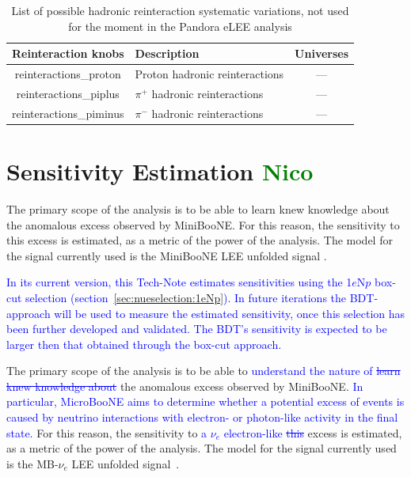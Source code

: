\documentclass[a4paper]{article}
\begin{document}
\begin{table}[H]
\centering
 \begin{tabular}{| c | m{6cm} | c |} 
    \hline
\hline
Reinteraction knobs & Description & Universes \\
\hline
reinteractions\_proton        &  Proton hadronic reinteractions  & ---\\ 
reinteractions\_piplus   &  $\pi^+$ hadronic reinteractions & ---\\ 
reinteractions\_piminus        & $\pi^-$ hadronic reinteractions  & ---\\ 
\hline
\end{tabular}
\caption{List of possible hadronic reinteraction systematic variations, not used for the moment in the Pandora eLEE analysis}
\label{tab:fluxsyst}
\end{table}

\newpage

\section{Sensitivity Estimation \textcolor{green}{Nico}}

\label{sec:Sensitivity2Osc}
The primary scope of the analysis is to be able to learn knew knowledge about the anomalous excess observed by MiniBooNE.
For this reason, the sensitivity to this excess is estimated, as a metric of the power of the analysis.
The model for the signal currently used is the MiniBooNE LEE unfolded signal \cite{bib:sbnfit20437}.

\label{sec:sensitivity}

\par \textcolor{blue}{In its current version, this Tech-Note estimates sensitivities using the 1$e$N$p$ box-cut selection (section~\ref{sec:nueselection:1eNp}). In future iterations the BDT-approach will be used to measure the estimated sensitivity, once this selection has been further developed and validated. The BDT's sensitivity is expected to be larger then that obtained through the box-cut approach.} 
\par The primary scope of the analysis is to be able to \textcolor{blue}{understand the nature of \st{learn knew knowledge about}} the anomalous excess observed by MiniBooNE. \textcolor{blue}{In particular, MicroBooNE aims to determine whether a potential excess of events is caused by neutrino interactions with electron- or photon-like activity in the final state.}
For this reason, the sensitivity to \textcolor{blue}{a $\nu_e$ electron-like \st{this}} excess is estimated, as a metric of the power of the analysis.
The model for the signal currently used is the MB-$\nu_e$ LEE unfolded signal~\cite{C2}.
\end{document}
